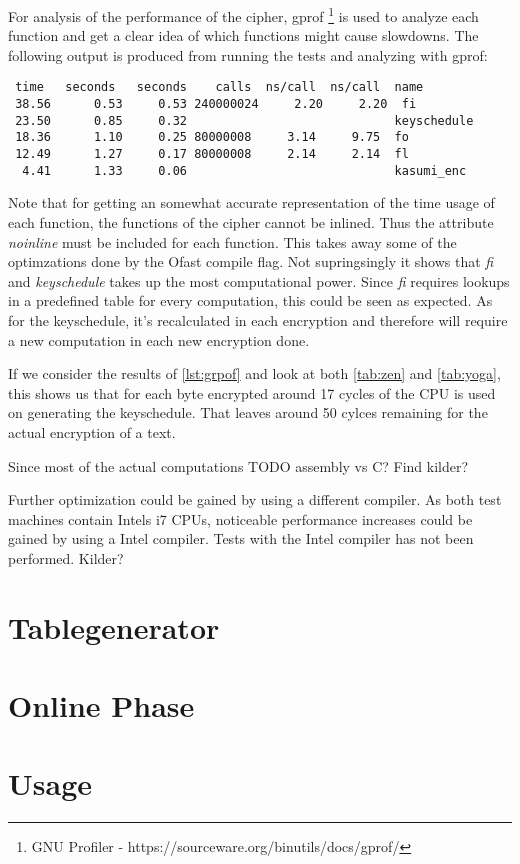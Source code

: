 For analysis of the performance of the cipher, gprof \footnote{GNU
  Profiler - https://sourceware.org/binutils/docs/gprof/} is used to
analyze each function and get a clear idea of which functions might
cause slowdowns. The following output is produced from running the
tests and analyzing with gprof:
\begin{lstlisting}[caption=Gprof output,captionpos=b,label=lst:grpof]
    %   cumulative   self              self     total           
 time   seconds   seconds    calls  ns/call  ns/call  name    
 38.56      0.53     0.53 240000024     2.20     2.20  fi
 23.50      0.85     0.32                             keyschedule
 18.36      1.10     0.25 80000008     3.14     9.75  fo
 12.49      1.27     0.17 80000008     2.14     2.14  fl
  4.41      1.33     0.06                             kasumi_enc
\end{lstlisting}
Note that for getting an somewhat accurate representation of the time usage of
each function, the functions of the cipher cannot be inlined. Thus the
attribute \textit{noinline} must be included for each function. This
takes away some of the optimzations done by the Ofast compile
flag. Not supringsingly it shows that \textit{fi} and
\textit{keyschedule} takes up the most computational
power. Since \textit{fi} requires lookups in a predefined table for every computation, this
could be seen as expected. As for the keyschedule, it's recalculated
in each encryption and therefore will require a new computation in
each new encryption done. 

If we consider the results of \ref{lst:grpof} and look at both
\ref{tab:zen} and \ref{tab:yoga}, this shows us that for each byte
encrypted around 17 cycles of the CPU is used on generating the
keyschedule. That leaves around 50 cylces remaining for the actual
encryption of a text.

Since most of the actual computations TODO assembly vs C? Find kilder?

Further optimization could be gained by using a different compiler. As
both test machines contain Intels i7 CPUs, noticeable performance
increases could be gained by using a Intel compiler. Tests with the
Intel compiler has not been performed. Kilder?

\section{Tablegenerator}

\section{Online Phase}

\section{Usage}



